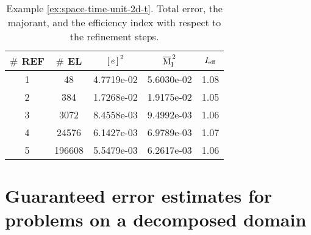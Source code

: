 \begin{example}
%
\begin{table}[!ht]
\centering
\footnotesize
\begin{tabular}{c|c|ccc}
$\#$ REF & $\#$ EL & ${[\,e\,]\,}^2$ & $\overline{\mathrm M}^{\,2}_{\mathrm{I}}$ & $I_{\rm eff}$\\
\midrule
1 & 48 & 4.7719e-02 & 5.6030e-02 & 1.08  \\
2 & 384 & 1.7268e-02 & 1.9175e-02 & 1.05 \\ 
3 & 3072 & 8.4558e-03 & 9.4992e-03 & 1.06 \\ 
4 & 24576 & 6.1427e-03 & 6.9789e-03 & 1.07 \\ 
5 & 196608 & 5.5479e-03 & 6.2617e-03 & 1.06 \\
\end{tabular}
\caption{Example \ref{ex:space-time-unit-2d-t}. 
Total error, the majorant, and the efficiency index with respect to the refinement steps.}
\label{tab:example-space-time-unit-2d-t-e-maj-ieff}
\end{table}


\end{example}

\clearpage

\section{Guaranteed error estimates for problems on a decomposed domain}
\label{sec:guaranteed-decomposed-domain}

